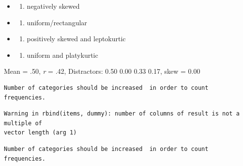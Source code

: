 \documentclass[
  english,
]{book}
\newenvironment{Shaded}{\begin{snugshade}}{\end{snugshade}}
\newcommand{\DataTypeTok}[1]{\textcolor[rgb]{0.13,0.29,0.53}{#1}}
\newcommand{\DecValTok}[1]{\textcolor[rgb]{0.00,0.00,0.81}{#1}}
\newcommand{\KeywordTok}[1]{\textcolor[rgb]{0.13,0.29,0.53}{\textbf{#1}}}
\newcommand{\NormalTok}[1]{#1}
\newcommand{\OperatorTok}[1]{\textcolor[rgb]{0.81,0.36,0.00}{\textbf{#1}}}
\providecommand{\tightlist}{%
  \setlength{\itemsep}{0pt}\setlength{\parskip}{0pt}}
\begin{document}
\begin{itemize}
\item
  \begin{enumerate}
  \def\labelenumi{\alph{enumi})}
  \tightlist
  \item
    negatively skewed
  \end{enumerate}
\item
  \begin{enumerate}
  \def\labelenumi{\alph{enumi})}
  \setcounter{enumi}{1}
  \tightlist
  \item
    uniform/rectangular
  \end{enumerate}
\item
  \begin{enumerate}
  \def\labelenumi{\alph{enumi})}
  \setcounter{enumi}{2}
  \tightlist
  \item
    positively skewed and leptokurtic
  \end{enumerate}
\item
  \begin{enumerate}
  \def\labelenumi{\alph{enumi})}
  \setcounter{enumi}{3}
  \tightlist
  \item
    uniform and platykurtic
  \end{enumerate}
\end{itemize}

Mean = .50, \emph{r} = .42, Distractors: 0.50 0.00 0.33 0.17, skew = 0.00

\begin{Shaded}
\end{Shaded}

\begin{verbatim}
Number of categories should be increased  in order to count frequencies. 
\end{verbatim}

\begin{verbatim}
Warning in rbind(items, dummy): number of columns of result is not a multiple of
vector length (arg 1)
\end{verbatim}

\begin{verbatim}
Number of categories should be increased  in order to count frequencies. 
\end{verbatim}
\end{document}

